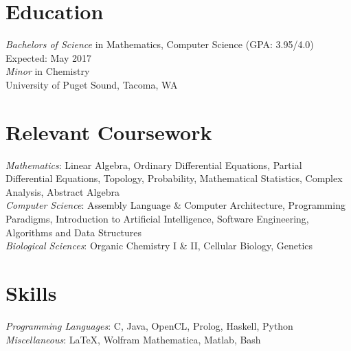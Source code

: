 \documentclass[letter]{res}
\begin{document}
\address{\texttt{https://mmore500.github.io}}
\address{541.740.6595, \texttt{mamoreno@pugetsound.edu}} 
\address{4029 Wheelock Student Center}
\address{Tacoma, Washington 98416}



\begin{resume}
\vspace{-2mm}

\vspace{-3.5mm}
\section{Education}
{\sl Bachelors of Science} in Mathematics, Computer Science (GPA: 3.95/4.0) \hfill Expected: May 2017\\
{\sl Minor} in Chemistry \\
University of Puget Sound,  Tacoma, WA
  \vspace{-3.5mm}

\section{Relevant Coursework }
  {\sl Mathematics}: Linear Algebra, Ordinary Differential Equations, Partial Differential Equations, Topology, Probability, Mathematical Statistics, Complex Analysis, Abstract Algebra\\
  {\sl Computer Science}: Assembly Language \& Computer Architecture, Programming Paradigms, Introduction to Artificial Intelligence, Software Engineering, Algorithms and Data Structures \\
  {\sl Biological Sciences}: Organic Chemistry I \& II, Cellular Biology, Genetics
\vspace{-3.5mm}

\section{Skills}
  {\sl Programming Languages}: C, Java, OpenCL, Prolog, Haskell, Python \\
  {\sl Miscellaneous}: \LaTeX, Wolfram Mathematica, Matlab, Bash
\vspace{-3.5mm}


\end{resume}
\end{document}

